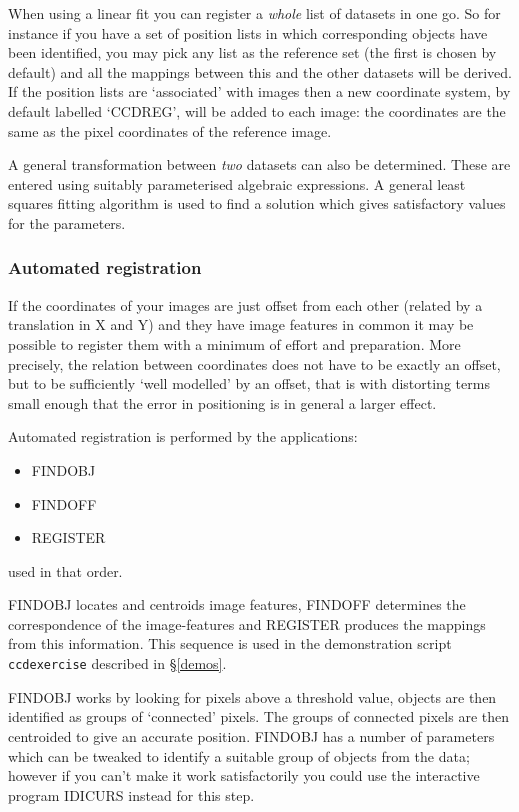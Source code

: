 \documentclass[twoside,11pt]{article}
\newcommand{\hyperref}[4]{#2\ref{#4}#3}
\newcommand{\htmlref}[2]{#1}
\newcommand{\xlabel}[1]{}
\renewcommand{\_}{\texttt{\symbol{95}}}
\newcommand{\routine}[1]{{\sc #1}}
\newcommand{\xroutine}[1]{\htmlref{{\sc #1}}{#1}}
\begin{document}
When using a linear fit you can register a {\em whole\/} list of datasets
in one go. So for instance if you have a set of position lists in which
corresponding objects have been identified, you may pick any list as the
reference set (the first is chosen by default) and all the mappings between
this and the other datasets will be derived. 
If the position lists are `associated' with images then a new 
coordinate system, 
by default labelled `CCD\_REG', will be added to each image:
the coordinates are the same as 
the pixel coordinates of the reference image.

A general transformation between {\em two\/} datasets can also be
determined. These are entered using suitably parameterised algebraic
expressions. A general least squares fitting algorithm is used to find
a solution which gives satisfactory values for the parameters.



\subsubsection{\xlabel{automatedregistration}Automated registration
               \label{automatedregistration}}

If the coordinates of your images are just offset from each other 
(related by a translation in X and Y)
and they have image features in
common it may be possible to register them with a minimum of effort and
preparation.
More precisely, the relation between coordinates does not have to
be exactly an offset, but to be
sufficiently `well modelled' by an offset, that is
with distorting terms small enough that the error in
positioning is in general a larger effect.

Automated registration is performed by the applications:
\begin{itemize}
\item \xroutine{FINDOBJ}
\item \xroutine{FINDOFF}
\item \xroutine{REGISTER}
\end{itemize}
used in that order.

\routine{FINDOBJ} locates and centroids image features,
\routine{FINDOFF} determines the
correspondence of the image-features and \routine{REGISTER} produces the
mappings from this information. This sequence is used in the
demonstration script
\hyperref{{\tt ccdexercise}}{{\tt ccdexercise} described in \S}{}{demos}.

\routine{FINDOBJ} works by looking for pixels above a threshold value, 
objects are
then identified as groups of `connected' pixels. The groups of connected
pixels are then centroided to give an accurate position.
\routine{FINDOBJ} has a number of parameters which can be tweaked
to identify a suitable group of objects from the data; 
however if you can't make it work satisfactorily you could use
the interactive program \xroutine{IDICURS} instead for this step.
\end{document}
